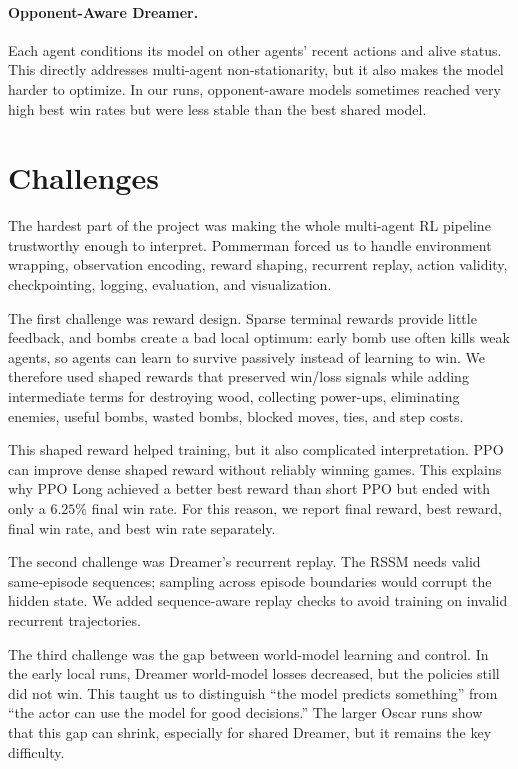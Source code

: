 \documentclass[11pt]{article}
\begin{document}
\paragraph{Opponent-Aware Dreamer.}
Each agent conditions its model on other agents' recent actions and alive status. This directly addresses multi-agent non-stationarity, but it also makes the model harder to optimize. In our runs, opponent-aware models sometimes reached very high best win rates but were less stable than the best shared model.

\section{Challenges}

The hardest part of the project was making the whole multi-agent RL pipeline trustworthy enough to interpret. Pommerman forced us to handle environment wrapping, observation encoding, reward shaping, recurrent replay, action validity, checkpointing, logging, evaluation, and visualization.

The first challenge was reward design. Sparse terminal rewards provide little feedback, and bombs create a bad local optimum: early bomb use often kills weak agents, so agents can learn to survive passively instead of learning to win. We therefore used shaped rewards that preserved win/loss signals while adding intermediate terms for destroying wood, collecting power-ups, eliminating enemies, useful bombs, wasted bombs, blocked moves, ties, and step costs.

This shaped reward helped training, but it also complicated interpretation. PPO can improve dense shaped reward without reliably winning games. This explains why PPO Long achieved a better best reward than short PPO but ended with only a $6.25\%$ final win rate. For this reason, we report final reward, best reward, final win rate, and best win rate separately.

The second challenge was Dreamer's recurrent replay. The RSSM needs valid same-episode sequences; sampling across episode boundaries would corrupt the hidden state. We added sequence-aware replay checks to avoid training on invalid recurrent trajectories.

The third challenge was the gap between world-model learning and control. In the early local runs, Dreamer world-model losses decreased, but the policies still did not win. This taught us to distinguish ``the model predicts something'' from ``the actor can use the model for good decisions.'' The larger Oscar runs show that this gap can shrink, especially for shared Dreamer, but it remains the key difficulty.
\end{document}
